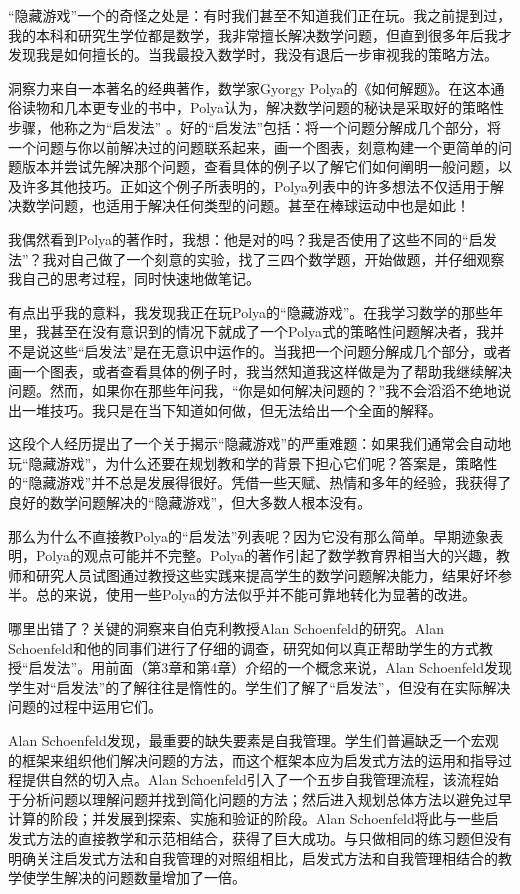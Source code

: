 “隐藏游戏”一个的奇怪之处是：有时我们甚至不知道我们正在玩。我之前提到过，我的本科和研究生学位都是数学，我非常擅长解决数学问题，但直到很多年后我才发现我是如何擅长的。当我最投入数学时，我没有退后一步审视我的策略方法。

洞察力来自一本著名的经典著作，数学家Gyorgy Polya的《如何解题》。在这本通俗读物和几本更专业的书中，Polya认为，解决数学问题的秘诀是采取好的策略性步骤，他称之为“启发法” 。好的“启发法”包括：将一个问题分解成几个部分，将一个问题与你以前解决过的问题联系起来，画一个图表，刻意构建一个更简单的问题版本并尝试先解决那个问题，查看具体的例子以了解它们如何阐明一般问题，以及许多其他技巧。正如这个例子所表明的，Polya列表中的许多想法不仅适用于解决数学问题，也适用于解决任何类型的问题。甚至在棒球运动中也是如此！

我偶然看到Polya的著作时，我想：他是对的吗？我是否使用了这些不同的“启发法”？我对自己做了一个刻意的实验，找了三四个数学题，开始做题，并仔细观察我自己的思考过程，同时快速地做笔记。

有点出乎我的意料，我发现我正在玩Polya的“隐藏游戏”。在我学习数学的那些年里，我甚至在没有意识到的情况下就成了一个Polya式的策略性问题解决者，我并不是说这些“启发法”是在无意识中运作的。当我把一个问题分解成几个部分，或者画一个图表，或者查看具体的例子时，我当然知道我这样做是为了帮助我继续解决问题。然而，如果你在那些年问我，“你是如何解决问题的？”我不会滔滔不绝地说出一堆技巧。我只是在当下知道如何做，但无法给出一个全面的解释。

这段个人经历提出了一个关于揭示“隐藏游戏”的严重难题：如果我们通常会自动地玩“隐藏游戏”，为什么还要在规划教和学的背景下担心它们呢？答案是，策略性的“隐藏游戏”并不总是发展得很好。凭借一些天赋、热情和多年的经验，我获得了良好的数学问题解决的“隐藏游戏”，但大多数人根本没有。

那么为什么不直接教Polya的“启发法”列表呢？因为它没有那么简单。早期迹象表明，Polya的观点可能并不完整。Polya的著作引起了数学教育界相当大的兴趣，教师和研究人员试图通过教授这些实践来提高学生的数学问题解决能力，结果好坏参半。总的来说，使用一些Polya的方法似乎并不能可靠地转化为显著的改进。

哪里出错了？关键的洞察来自伯克利教授Alan Schoenfeld的研究。Alan Schoenfeld和他的同事们进行了仔细的调查，研究如何以真正帮助学生的方式教授“启发法”。用前面（第3章和第4章）介绍的一个概念来说，Alan Schoenfeld发现学生对“启发法”的了解往往是惰性的。学生们了解了“启发法”，但没有在实际解决问题的过程中运用它们。

Alan Schoenfeld发现，最重要的缺失要素是自我管理。学生们普遍缺乏一个宏观的框架来组织他们解决问题的方法，而这个框架本应为启发式方法的运用和指导过程提供自然的切入点。Alan Schoenfeld引入了一个五步自我管理流程，该流程始于分析问题以理解问题并找到简化问题的方法；然后进入规划总体方法以避免过早计算的阶段；并发展到探索、实施和验证的阶段。Alan Schoenfeld将此与一些启发式方法的直接教学和示范相结合，获得了巨大成功。与只做相同的练习题但没有明确关注启发式方法和自我管理的对照组相比，启发式方法和自我管理相结合的教学使学生解决的问题数量增加了一倍。

